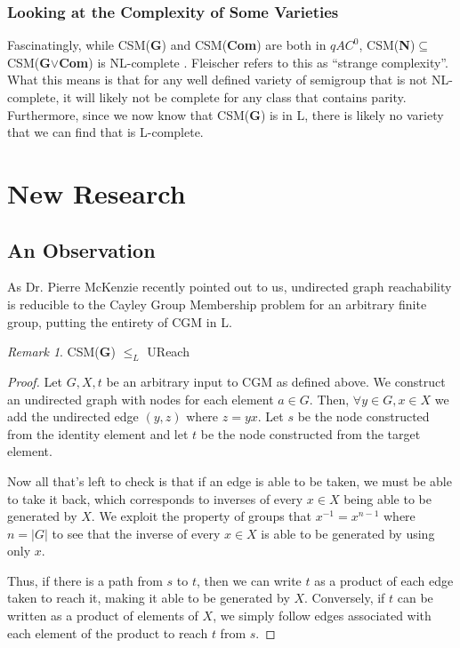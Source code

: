 \documentclass[a4paper,12pt]{article}
\theoremstyle{plain}
\theoremstyle{definition}
\theoremstyle{remark}
\newtheorem{remark}{Remark}
\begin{document}
\subsubsection{Looking at the Complexity of Some Varieties}
Fascinatingly, while CSM(\textbf{G}) and CSM(\textbf{Com}) are both in $qAC^0$, CSM(\textbf{N})$\subseteq$CSM(\textbf{G}$\lor$\textbf{Com}) is NL-complete \cite{Jones1976}. Fleischer refers to this as ``strange complexity''. What this means is that for any well defined variety of semigroup that is not NL-complete, it will likely not be complete for any class that contains parity. Furthermore, since we now know that CSM(\textbf{G}) is in L, there is likely no variety that we can find that is L-complete. 

\section{New Research}
\subsection{An Observation}
As Dr. Pierre McKenzie recently pointed out to us, undirected graph reachability is reducible to the Cayley Group Membership problem for an arbitrary finite group, putting the entirety of CGM in L.
\begin{remark}
    CSM(\textbf{G}) $\leq_L$ UReach 
\end{remark}
\begin{proof}
  Let $G,X,t$ be an arbitrary input to CGM as defined above. We construct an undirected graph with nodes for each element $a\in G$. Then, $\forall y\in G,x\in X$ we add the undirected edge $(y,z)$ where $z=yx$. Let $s$ be the node constructed from the identity element and let $t$ be the node constructed from the target element. \vspace{\baselineskip}
    
  Now all that's left to check is that if an edge is able to be taken, we must be able to take it back, which corresponds to inverses of every $x\in X$ being able to be generated by $X$. We exploit the property of groups that $x^{-1}=x^{n-1}$ where $n=|G|$ to see that the inverse of every $x\in X$ is able to be generated by using only $x$. \vspace{\baselineskip}

  Thus, if there is a path from $s$ to $t$, then we can write $t$ as a product of each edge taken to reach it, making it able to be generated by $X$. Conversely, if $t$ can be written as a product of elements of $X$, we simply follow edges associated with each element of the product to reach $t$ from $s$. 
\end{proof}
\end{document}
